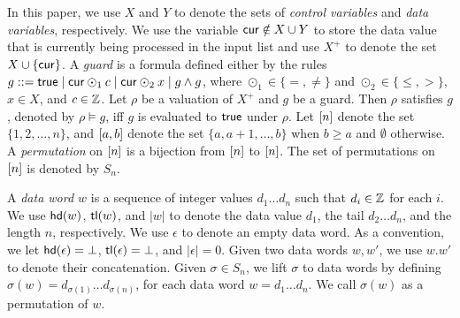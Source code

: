 In this paper, we use $X$ and $Y$ to denote the sets of \emph{control variables} and \emph{data variables}, respectively. We use the variable $\mathsf{cur} \notin X\cup Y$ to store the data value that is currently being processed in the input list and use $X^+$ to denote the set $X\cup \{\mathsf{cur}\}$.
A \emph{guard} is a formula defined either by the rules $g::= \mathsf{true} \mid \mathsf{cur} \odot_1 c \mid \mathsf{cur} \odot_2 x \mid g \wedge g$, where $\odot_1 \in \{=,\neq\}$ and $\odot_2 \in \{\le, >\}$, $x \in X$, and $c\in {\mathbb{Z} }$. 
Let $\rho$ be a valuation of $X^+$ and $g$ be a guard. Then $\rho$ satisfies $g$, denoted by $\rho \models g$, iff $g$ is evaluated to $\mathsf{true}$ under $\rho$. 
Let $[n]$ denote the set $\{ 1, 2, \dots, n \}$, and $[a,b]$ denote the set $\{ a, a+1, \dots, b \}$ when $b\geq a$ and $\emptyset$ otherwise. A \emph{permutation} on
$[n]$ is a bijection from $[n]$ to
$[n]$. The set of
permutations on $[n]$ is denoted by $S_n$.

A \emph{data word $w$} is a sequence of integer values $d_1\dots d_n$ such that $d_i \in {\mathbb{Z} }$ for each $i$.
We use $\mathsf{hd}(w)$, $\mathsf{tl}(w)$, and $|w|$ to denote the data value $d_1$, the tail $d_2\dots d_n$, and the length $n$, respectively.
We use $\epsilon$ to denote an empty data word. As a convention, we let $\mathsf{hd}(\epsilon)=\bot$, $\mathsf{tl}(\epsilon)=\bot$, and $|\epsilon|=0$.
Given two data words $w,w'$, we use $w.w'$ to denote their concatenation.
Given $\sigma \in S_n$, we lift $\sigma$ to data words by defining $\sigma(w)=d_{\sigma(1)} \dots d_{\sigma(n)}$, for each data word $w=d_1\dots d_n$. We call $\sigma(w)$ as a permutation of $w$.